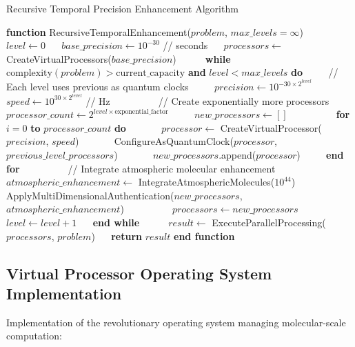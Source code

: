 \documentclass[12pt,a4paper]{article}
\theoremstyle{definition}
\begin{document}
{\begin{algorithm}
\caption{Recursive Temporal Precision Enhancement Algorithm}
\begin{algorithmic}[1]
\STATE \textbf{function} RecursiveTemporalEnhancement($problem$, $max\_levels = \infty$)
\STATE $\quad$ $level \leftarrow 0$
\STATE $\quad$ $base\_precision \leftarrow 10^{-30}$ // seconds
\STATE $\quad$ $processors \leftarrow$ CreateVirtualProcessors($base\_precision$)
\STATE $\quad$
\STATE $\quad$ \textbf{while} $\text{complexity}(problem) > \text{current\_capacity}$ \textbf{and} $level < max\_levels$ \textbf{do}
\STATE $\quad\quad$ // Each level uses previous as quantum clocks
\STATE $\quad\quad$ $precision \leftarrow 10^{-30 \times 2^{level}}$
\STATE $\quad\quad$ $speed \leftarrow 10^{30 \times 2^{level}}$ // Hz
\STATE $\quad\quad$
\STATE $\quad\quad$ // Create exponentially more processors
\STATE $\quad\quad$ $processor\_count \leftarrow 2^{level \times \text{exponential\_factor}}$
\STATE $\quad\quad$ $new\_processors \leftarrow []$
\STATE $\quad\quad$
\STATE $\quad\quad$ \textbf{for} $i = 0$ \textbf{to} $processor\_count$ \textbf{do}
\STATE $\quad\quad\quad$ $processor \leftarrow$ CreateVirtualProcessor($precision$, $speed$)
\STATE $\quad\quad\quad$ ConfigureAsQuantumClock($processor$, $previous\_level\_processors$)
\STATE $\quad\quad\quad$ $new\_processors$.append($processor$)
\STATE $\quad\quad$ \textbf{end for}
\STATE $\quad\quad$
\STATE $\quad\quad$ // Integrate atmospheric molecular enhancement
\STATE $\quad\quad$ $atmospheric\_enhancement \leftarrow$ IntegrateAtmosphericMolecules($10^{44}$)
\STATE $\quad\quad$ ApplyMultiDimensionalAuthentication($new\_processors$, $atmospheric\_enhancement$)
\STATE $\quad\quad$
\STATE $\quad\quad$ $processors \leftarrow new\_processors$
\STATE $\quad\quad$ $level \leftarrow level + 1$
\STATE $\quad$ \textbf{end while}
\STATE $\quad$
\STATE $\quad$ $result \leftarrow$ ExecuteParallelProcessing($processors$, $problem$)
\STATE $\quad$ \textbf{return} $result$
\STATE \textbf{end function}
\end{algorithmic}
\end{algorithm}

\subsection{Virtual Processor Operating System Implementation}

Implementation of the revolutionary operating system managing molecular-scale computation:

}
\end{document}
